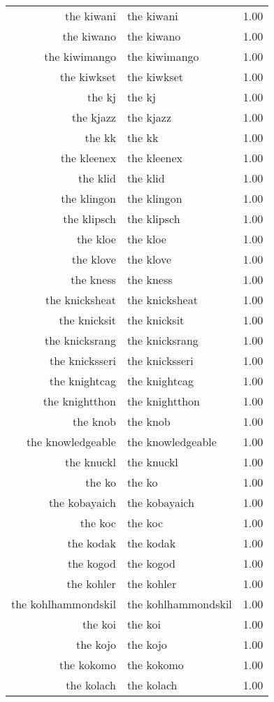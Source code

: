 \begin{table}[ht]
\begin{tabular}{rlr}
  the kiwani & the kiwani & 1.00 \\ 
  the kiwano & the kiwano & 1.00 \\ 
  the kiwimango & the kiwimango & 1.00 \\ 
  the kiwkset & the kiwkset & 1.00 \\ 
  the kj & the kj & 1.00 \\ 
  the kjazz & the kjazz & 1.00 \\ 
  the kk & the kk & 1.00 \\ 
  the kleenex & the kleenex & 1.00 \\ 
  the klid & the klid & 1.00 \\ 
  the klingon & the klingon & 1.00 \\ 
  the klipsch & the klipsch & 1.00 \\ 
  the kloe & the kloe & 1.00 \\ 
  the klove & the klove & 1.00 \\ 
  the kness & the kness & 1.00 \\ 
  the knicksheat & the knicksheat & 1.00 \\ 
  the knicksit & the knicksit & 1.00 \\ 
  the knicksrang & the knicksrang & 1.00 \\ 
  the knicksseri & the knicksseri & 1.00 \\ 
  the knightcag & the knightcag & 1.00 \\ 
  the knightthon & the knightthon & 1.00 \\ 
  the knob & the knob & 1.00 \\ 
  the knowledgeable & the knowledgeable & 1.00 \\ 
  the knuckl & the knuckl & 1.00 \\ 
  the ko & the ko & 1.00 \\ 
  the kobayaich & the kobayaich & 1.00 \\ 
  the koc & the koc & 1.00 \\ 
  the kodak & the kodak & 1.00 \\ 
  the kogod & the kogod & 1.00 \\ 
  the kohler & the kohler & 1.00 \\ 
  the kohlhammondskil & the kohlhammondskil & 1.00 \\ 
  the koi & the koi & 1.00 \\ 
  the kojo & the kojo & 1.00 \\ 
  the kokomo & the kokomo & 1.00 \\ 
  the kolach & the kolach & 1.00 \\ 

\end{tabular}
\end{table}
